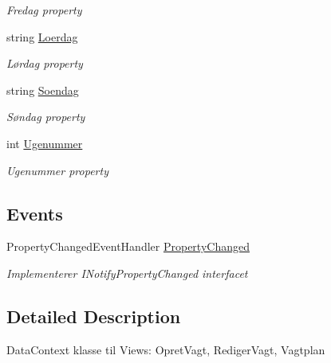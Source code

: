 \begin{DoxyCompactItemize}
\begin{DoxyCompactList}\small\item\em Fredag property \end{DoxyCompactList}\item 
string \hyperlink{class__1aarsproeve_1_1_view_model_1_1_vagtplan_view_model_aa7572363a0fffba490fb61060c922594}{Loerdag}
\begin{DoxyCompactList}\small\item\em Lørdag property \end{DoxyCompactList}\item 
string \hyperlink{class__1aarsproeve_1_1_view_model_1_1_vagtplan_view_model_abdd4c1e28095f4c2660a5ad71bab51ee}{Soendag}
\begin{DoxyCompactList}\small\item\em Søndag property \end{DoxyCompactList}\item 
int \hyperlink{class__1aarsproeve_1_1_view_model_1_1_vagtplan_view_model_a34eaf9433fb67fa445834864cc4117d4}{Ugenummer}
\begin{DoxyCompactList}\small\item\em Ugenummer property \end{DoxyCompactList}\end{DoxyCompactItemize}
\subsection*{Events}
\begin{DoxyCompactItemize}
\item 
Property\+Changed\+Event\+Handler \hyperlink{class__1aarsproeve_1_1_view_model_1_1_vagtplan_view_model_ac94848da2b60b3f4199b22427f3cf101}{Property\+Changed}
\begin{DoxyCompactList}\small\item\em Implementerer I\+Notify\+Property\+Changed interfacet \end{DoxyCompactList}\end{DoxyCompactItemize}


\subsection{Detailed Description}
Data\+Context klasse til Views\+: Opret\+Vagt, Rediger\+Vagt, Vagtplan 



